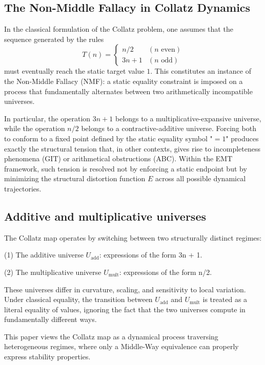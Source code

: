 \documentclass[11pt]{article}
\theoremstyle{definition}
\theoremstyle{remark}
\begin{document}
\subsection{The Non-Middle Fallacy in Collatz Dynamics}

In the classical formulation of the Collatz problem, one assumes that
the sequence generated by the rules
\[
T(n) = 
\begin{cases}
n/2 & (n \text{ even}) \\
3n+1 & (n \text{ odd})
\end{cases}
\]
must eventually reach the static target value $1$. This constitutes an
instance of the Non-Middle Fallacy (NMF): a static equality constraint
is imposed on a process that fundamentally alternates between two
arithmetically incompatible universes.

In particular, the operation $3n+1$ belongs to a multiplicative-expansive
universe, while the operation $n/2$ belongs to a contractive-additive
universe. Forcing both to conform to a fixed point defined by the static
equality symbol "$=1$" produces exactly the structural tension that, in
other contexts, gives rise to incompleteness phenomena (GIT) or
arithmetical obstructions (ABC). Within the EMT framework, such tension
is resolved not by enforcing a static endpoint but by minimizing the
structural distortion function $E$ across all possible dynamical
trajectories.

\subsection{Additive and multiplicative universes}

The Collatz map operates by switching between two structurally distinct
regimes:

(1) The additive universe $U_{\mathrm{add}}$:
    expressions of the form 3n + 1.

(2) The multiplicative universe $U_{\mathrm{mult}}$:
    expressions of the form n/2.

These universes differ in curvature, scaling, and sensitivity to local
variation. Under classical equality, the transition between $U_{\mathrm{add}}$ and
$U_{\mathrm{mult}}$ is treated as a literal equality of values, ignoring the fact that
the two universes compute in fundamentally different ways.

This paper views the Collatz map as a dynamical process traversing
heterogeneous regimes, where only a Middle-Way equivalence can properly
express stability properties.
\end{document}
